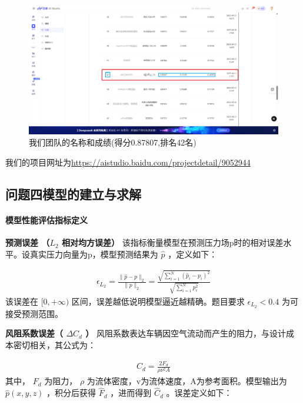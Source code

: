 \documentclass{MMCStyle}
\begin{document}
\begin{figure}[H]
\centering%
\includegraphics[width=13 cm]{figure/fig15.png}
\caption{我们团队的名称和成绩(得分0.87807,排名42名)}\label{fig15}
\end{figure}   
\unskip

我们的项目网址为\url{https://aistudio.baidu.com/projectdetail/9052944}



	\subsection{问题四模型的建立与求解}


	\paragraph{模型性能评估指标定义}
\textbf{预测误差 （$L_{2}$ 相对均方误差）}
该指标衡量模型在预测压力场p时的相对误差水平。设真实压力向量为p，模型预测结果为 $\hat{p}$ ，定义如下：


    \begin{eqnarray} 
    \epsilon_{L_2}=\frac{\parallel\hat{p}-p\parallel_2}{\parallel p\parallel_2}=\frac{\sqrt{\sum_{i=1}^N\left(\hat{p}_i-p_i\right)^2}}{\sqrt{\sum_{i=1}^Np_i^2}}
    \end{eqnarray}
该误差在 $[0,+\infty)$ 区间，误差越低说明模型逼近越精确。题目要求 $\epsilon_{L_{2}}<0.4$ 为可接受预测范围。

\textbf{风阻系数误差（ $\Delta C_{d}$ ）}
风阻系数表达车辆因空气流动而产生的阻力，与设计成本密切相关，其公式为：


    \begin{eqnarray} 
    C_{d}=\frac{2F_{d}}{\rho\nu^{2}A}
    \end{eqnarray}
其中， $F_{d}$ 为阻力， $\rho$ 为流体密度，v为流体速度，A为参考面积。模型输出为 $\hat{p}(x, y, z)$ ，积分后获得 $\hat{F}_{d}$ ，进而得到 $\hat{C}_{d}$ 。误差定义如下：
\end{document}
